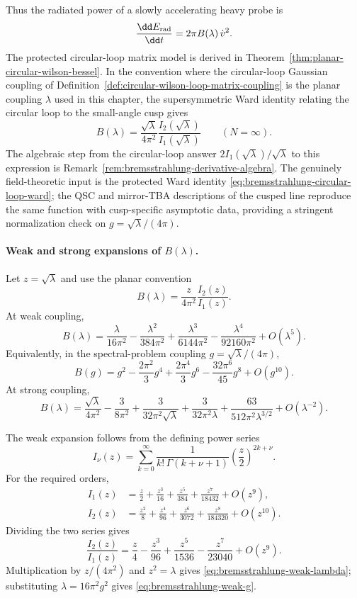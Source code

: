 Thus the radiated power of a slowly accelerating heavy probe is
\[
  \frac{\dd E_{\rm rad}}{\dd t}=2\pi B(\lambda)\,\dot v^2 .
\]
The protected circular-loop matrix model is derived in
Theorem~\ref{thm:planar-circular-wilson-bessel}.  In the convention where
the circular-loop Gaussian coupling of
Definition~\ref{def:circular-wilson-loop-matrix-coupling} is the planar
coupling \(\lambda\) used in this chapter, the supersymmetric Ward identity
relating the circular loop to the small-angle cusp gives
\[
  B(\lambda)
  =
  \frac{\sqrt\lambda}{4\pi^2}
  \frac{I_2(\sqrt\lambda)}{I_1(\sqrt\lambda)}
  \qquad (N=\infty).
\]
The algebraic step from the circular-loop answer
\(2I_1(\sqrt\lambda)/\sqrt\lambda\) to this expression is
Remark~\ref{rem:bremsstrahlung-derivative-algebra}.  The genuinely
field-theoretic input is the protected Ward identity
\eqref{eq:bremsstrahlung-circular-loop-ward}; the QSC and mirror-TBA
descriptions of the cusped line reproduce the same function with
cusp-specific asymptotic data, providing a stringent normalization check on
\(g=\sqrt\lambda/(4\pi)\).

\paragraph{Weak and strong expansions of \(B(\lambda)\).}
Let \(z=\sqrt\lambda\) and use the planar convention
\[
  B(\lambda)
  =
  \frac{z}{4\pi^2}\frac{I_2(z)}{I_1(z)} .
\]
At weak coupling,
\begin{equation}
  B(\lambda)
  =
  \frac{\lambda}{16\pi^2}
  -\frac{\lambda^2}{384\pi^2}
  +\frac{\lambda^3}{6144\pi^2}
  -\frac{\lambda^4}{92160\pi^2}
  +O(\lambda^5).
  \label{eq:bremsstrahlung-weak-lambda}
\end{equation}
Equivalently, in the spectral-problem coupling
\(g=\sqrt\lambda/(4\pi)\),
\begin{equation}
  B(g)
  =
  g^2-\frac{2\pi^2}{3}g^4+\frac{2\pi^4}{3}g^6
  -\frac{32\pi^6}{45}g^8+O(g^{10}).
  \label{eq:bremsstrahlung-weak-g}
\end{equation}
At strong coupling,
\begin{equation}
  B(\lambda)
  =
  \frac{\sqrt\lambda}{4\pi^2}
  -\frac{3}{8\pi^2}
  +\frac{3}{32\pi^2\sqrt\lambda}
  +\frac{3}{32\pi^2\lambda}
  +\frac{63}{512\pi^2\lambda^{3/2}}
  +O(\lambda^{-2}).
  \label{eq:bremsstrahlung-strong-lambda}
\end{equation}

The weak expansion follows from the defining power series
\[
  I_\nu(z)
  =
  \sum_{k=0}^{\infty}
  \frac{1}{k!\,\Gamma(k+\nu+1)}
  \left(\frac z2\right)^{2k+\nu}.
\]
For the required orders,
\[
\begin{aligned}
  I_1(z)
  &=
  \frac z2+\frac{z^3}{16}+\frac{z^5}{384}
  +\frac{z^7}{18432}+O(z^9),\\
  I_2(z)
  &=
  \frac{z^2}{8}+\frac{z^4}{96}+\frac{z^6}{3072}
  +\frac{z^8}{184320}+O(z^{10}).
\end{aligned}
\]
Dividing the two series gives
\[
  \frac{I_2(z)}{I_1(z)}
  =
  \frac z4-\frac{z^3}{96}+\frac{z^5}{1536}
  -\frac{z^7}{23040}+O(z^9).
\]
Multiplication by \(z/(4\pi^2)\) and \(z^2=\lambda\) gives
\eqref{eq:bremsstrahlung-weak-lambda}; substituting
\(\lambda=16\pi^2g^2\) gives \eqref{eq:bremsstrahlung-weak-g}.

